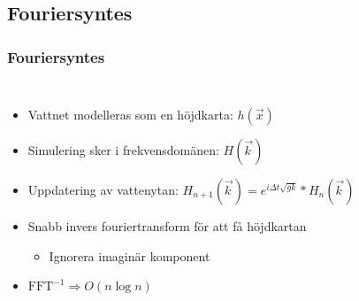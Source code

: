 \subsection{Fouriersyntes}


\begin{frame}
\frametitle{Fouriersyntes}

\begin{columns}[c]


\begin{itemize}[<+(1)->]
\item Vattnet modelleras som en höjdkarta: $h(\vec{x})$
\item Simulering sker i frekvensdomänen: $H(\vec{k\,})$
    \setcounter{frequencydomainpauses}{\thebeamerpauses}
\item Uppdatering av vattenytan: $\displaystyle H_{n+1}(\vec{k\,}) = e^{i\Delta t\sqrt{gk}}*H_{n}(\vec{k\,})$
\item Snabb invers fouriertransform för att få höjdkartan 
    \begin{itemize}[<+(1)->]
    \item Ignorera imaginär komponent
    \end{itemize}
\item $\text{FFT}^{-1} \Rightarrow O(n \log n)$
\end{itemize}



\end{columns}
\end{frame}
